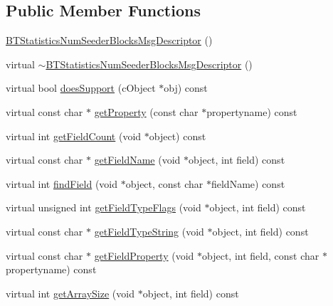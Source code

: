 \subsection*{Public Member Functions}
\begin{DoxyCompactItemize}
\item 
\hyperlink{classBTStatisticsNumSeederBlocksMsgDescriptor_af85eb363d05f9c88afbeca2c959865c3}{B\+T\+Statistics\+Num\+Seeder\+Blocks\+Msg\+Descriptor} ()
\item 
virtual \hyperlink{classBTStatisticsNumSeederBlocksMsgDescriptor_a8c1fecb22b154ec7e0505269af19c5ba}{$\sim$\+B\+T\+Statistics\+Num\+Seeder\+Blocks\+Msg\+Descriptor} ()
\item 
virtual bool \hyperlink{classBTStatisticsNumSeederBlocksMsgDescriptor_ad074d02067d275f08bd8e53180b12c94}{does\+Support} (c\+Object $\ast$obj) const 
\item 
virtual const char $\ast$ \hyperlink{classBTStatisticsNumSeederBlocksMsgDescriptor_a66a4a42b5791292bfb9263ea971fed95}{get\+Property} (const char $\ast$propertyname) const 
\item 
virtual int \hyperlink{classBTStatisticsNumSeederBlocksMsgDescriptor_a70257cf57d679793df1b079e5484e17b}{get\+Field\+Count} (void $\ast$object) const 
\item 
virtual const char $\ast$ \hyperlink{classBTStatisticsNumSeederBlocksMsgDescriptor_a80c7b028a3bafce0098df429b9551d87}{get\+Field\+Name} (void $\ast$object, int field) const 
\item 
virtual int \hyperlink{classBTStatisticsNumSeederBlocksMsgDescriptor_af848ccb483577f6953d1ebfe5c7950da}{find\+Field} (void $\ast$object, const char $\ast$field\+Name) const 
\item 
virtual unsigned int \hyperlink{classBTStatisticsNumSeederBlocksMsgDescriptor_a20e1005a6ab40b485b3f2b1eb8638dbd}{get\+Field\+Type\+Flags} (void $\ast$object, int field) const 
\item 
virtual const char $\ast$ \hyperlink{classBTStatisticsNumSeederBlocksMsgDescriptor_a6b10603bcde840217883848f4eb43baf}{get\+Field\+Type\+String} (void $\ast$object, int field) const 
\item 
virtual const char $\ast$ \hyperlink{classBTStatisticsNumSeederBlocksMsgDescriptor_a92f6318c1889c5cbd7d023c62daa92ee}{get\+Field\+Property} (void $\ast$object, int field, const char $\ast$propertyname) const 
\item 
virtual int \hyperlink{classBTStatisticsNumSeederBlocksMsgDescriptor_a63292c681585b96f92f9450dc0723f4f}{get\+Array\+Size} (void $\ast$object, int field) const 

\end{DoxyCompactItemize}
